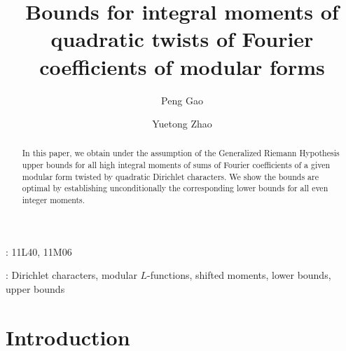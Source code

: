 \documentclass[twoside,leqno,10pt, A4]{amsart}
\begin{document}
\newcommand{\ppmod}[1]{\hspace{-0.15cm}\pmod{#1}}
\newcommand{\ccom}[1]{{\color{red}{Chantal: #1}} }
\newcommand{\acom}[1]{{\color{blue}{Alia: #1}} }
\newcommand{\alexcom}[1]{{\color{green}{Alex: #1}} }
\newcommand{\hcom}[1]{{\color{brown}{Hua: #1}} }


\makeatletter
\def\widebreve{\mathpalette\wide@breve}
\def\wide@breve#1#2{\sbox\z@{$#1#2$}%
     \mathop{\vbox{\m@th\ialign{##\crcr
\kern0.08em\brevefill#1{0.8\wd\z@}\crcr\noalign{\nointerlineskip}%
                    $\hss#1#2\hss$\crcr}}}\limits}
\def\brevefill#1#2{$\m@th\sbox\tw@{$#1($}%
  \hss\resizebox{#2}{\wd\tw@}{\rotatebox[origin=c]{90}{\upshape(}}\hss$}
\makeatletter

\title[Bounds for integral moments of  quadratic twists of Fourier coefficients of modular forms]{Bounds for integral moments of quadratic twists of Fourier coefficients of modular forms}

\author[P. Gao]{Peng Gao}
\address{School of Mathematical Sciences, Beihang University, Beijing 100191, China}

\author[Y. Zhao]{Yuetong Zhao}
\address{School of Mathematical Sciences, Beihang University, Beijing 100191, China}


\begin{abstract}
In this paper, we obtain under the assumption of the Generalized Riemann Hypothesis upper bounds for all high integral moments of sums of Fourier coefficients of a given modular form twisted by quadratic Dirichlet characters. We show the bounds are optimal by establishing unconditionally the corresponding lower bounds for all even integer moments.
\end{abstract}

\maketitle

: 11L40, 11M06  \newline

: Dirichlet characters, modular $L$-functions, shifted moments, lower bounds, upper bounds

\section{Introduction}\label{sec 1}
\end{document}
